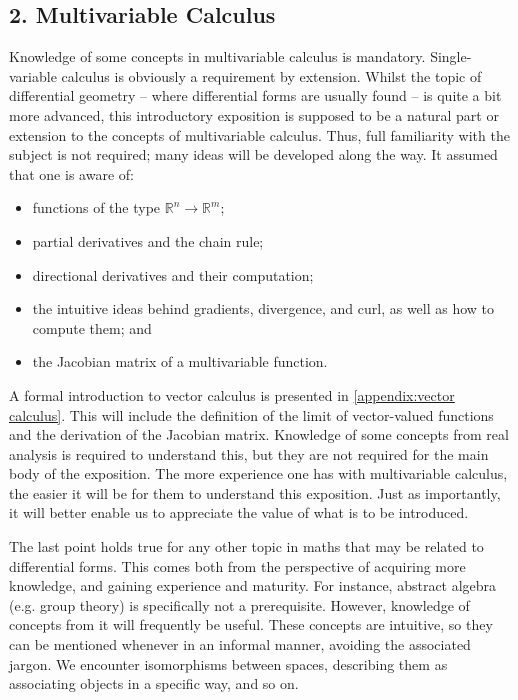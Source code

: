 \documentclass[a4paper,12pt]{article}
\begin{document}
\subsection*{2. Multivariable Calculus}
Knowledge of some concepts in multivariable calculus is mandatory.
Single-variable calculus is obviously a requirement by extension.
Whilst the topic of differential geometry -- where differential forms are usually found -- is quite a bit more advanced, this introductory exposition is supposed to be a natural part or extension to the concepts of multivariable calculus.
Thus, full familiarity with the subject is not required; many ideas will be developed along the way.
It assumed that one is aware of:
\begin{itemize}
    \item functions of the type $\mathbb{R}^n \to \mathbb{R}^m$;
    \item partial derivatives and the chain rule;
    \item directional derivatives and their computation;
    \item the intuitive ideas behind gradients, divergence, and curl, as well as how to compute them; and
    \item the Jacobian matrix of a multivariable function.
\end{itemize}
A formal introduction to vector calculus is presented in \cref{appendix:vector calculus}.
This will include the definition of the limit of vector-valued functions and the derivation of the Jacobian matrix.
Knowledge of some concepts from real analysis is required to understand this, but they are not required for the main body of the exposition.
The more experience one has with multivariable calculus, the easier it will be for them to understand this exposition.
Just as importantly, it will better enable us to appreciate the value of what is to be introduced.

The last point holds true for any other topic in maths that may be related to differential forms.
This comes both from the perspective of acquiring more knowledge, and gaining experience and maturity.
For instance, abstract algebra (e.g. group theory) is specifically not a prerequisite.
However, knowledge of concepts from it will frequently be useful.
These concepts are intuitive, so they can be mentioned whenever in an informal manner, avoiding the associated jargon.
We encounter isomorphisms between spaces, describing them as associating objects in a specific way, and so on.

\pagebreak
\end{document}
